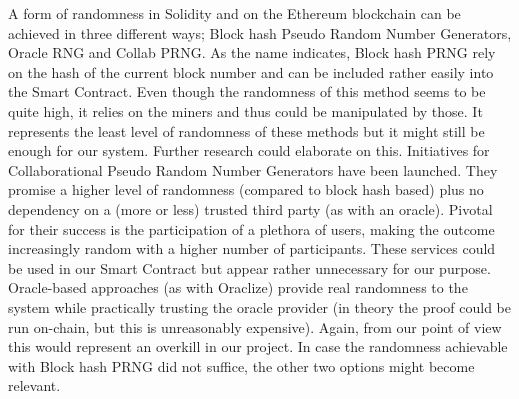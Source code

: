 A form of randomness in Solidity and on the Ethereum blockchain can be achieved in three different ways; Block hash Pseudo Random Number Generators, Oracle RNG and Collab PRNG.
As the name indicates, Block hash PRNG rely on the hash of the current block number and can be included rather easily into the Smart Contract. Even though the randomness of this method seems to be quite high, it relies on the miners and thus could be manipulated by those. It represents the least level of randomness of these methods but it might still be enough for our system. Further research could elaborate on this.
Initiatives for Collaborational Pseudo Random Number Generators have been launched. They promise a higher level of randomness (compared to block hash based) plus no dependency on a (more or less) trusted third party (as with an oracle). Pivotal for their success is the participation of a plethora of users, making the outcome increasingly random with a higher number of participants. These services could be used in our Smart Contract but appear rather unnecessary for our purpose.
Oracle-based approaches (as with Oraclize) provide real randomness to the system while practically trusting the oracle provider (in theory the proof could be run on-chain, but this is unreasonably expensive). Again, from our point of view this would represent an overkill in our project.
In case the randomness achievable with Block hash PRNG did not suffice, the other two options might become relevant.
